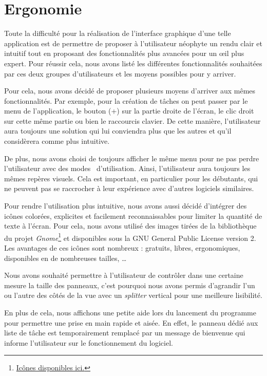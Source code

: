 	
	\section{Ergonomie}
		Toute la difficulté pour la réalisation de l'interface graphique d'une telle application est de permettre de proposer à l'utilisateur néophyte un rendu clair et intuitif tout en proposant des fonctionnalités plus avancées pour un {\oe}il plus expert. Pour réussir cela, nous avons listé les différentes fonctionnalités souhaitées par ces deux groupes d'utilisateurs et les moyens possibles pour y arriver.
		
		Pour cela, nous avons décidé de proposer plusieurs moyens d'arriver aux mêmes fonctionnalités. Par exemple, pour la création de tâches on peut passer par le menu de l'application, le bouton (+) sur la partie droite de l'écran, le clic droit sur cette même partie ou bien le raccourcis clavier. De cette manière, l'utilisateur aura toujours une solution qui lui conviendra plus que les autres et qu'il considèrera comme plus intuitive.
		
		De plus, nous avons choisi de toujours afficher le même menu pour ne pas perdre l'utilisateur avec des \og modes \fg ~d'utilisation. Ainsi, l'utilisateur aura toujours les mêmes repères visuels. Cela est important, en particulier pour les débutants, qui ne peuvent pas se raccrocher à leur expérience avec d'autres logiciels similaires.\newline
		
		Pour rendre l'utilisation plus intuitive, nous avons aussi décidé d'intégrer des icônes colorées, explicites et facilement reconnaissables pour limiter la quantité de texte à l'écran. Pour cela, nous avons utilisé des images tirées de la bibliothèque du projet \emph{Gnome}\footnote{\href{https://commons.wikimedia.org/wiki/GNOME_Desktop_icons}{Icônes disponibles ici.}} et disponibles sous la GNU General Public License version 2. Les avantages de ces icônes sont nombreux : gratuits, libres, ergonomiques, disponibles en de nombreuses tailles, \dots \newline
		
		Nous avons souhaité permettre à l'utilisateur de contrôler dans une certaine mesure la taille des panneaux, c'est pourquoi nous avons permis d'agrandir l'un ou l'autre des côtés de la vue avec un \emph{splitter} vertical pour une meilleure lisibilité.
		
		En plus de cela, nous affichons une petite aide lors du lancement du programme pour permettre une prise en main rapide et aisée. En effet, le panneau dédié aux liste de tâche est temporairement remplacé par un message de bienvenue qui informe l'utilisateur sur le fonctionnement du logiciel.
		
